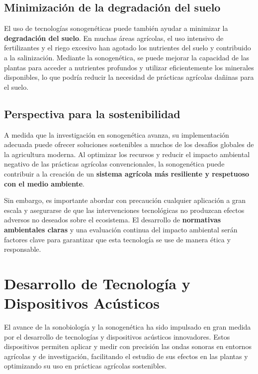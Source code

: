 \documentclass[twocolumn]{article}
\begin{document}
\subsection{Minimización de la degradación del suelo}

El uso de tecnologías sonogenéticas puede también ayudar a minimizar la \textbf{degradación del suelo}. En muchas áreas agrícolas, el uso intensivo de fertilizantes y el riego excesivo han agotado los nutrientes del suelo y contribuido a la salinización. Mediante la sonogenética, se puede mejorar la capacidad de las plantas para acceder a nutrientes profundos y utilizar eficientemente los minerales disponibles, lo que podría reducir la necesidad de prácticas agrícolas dañinas para el suelo.


\subsection{Perspectiva para la sostenibilidad}

A medida que la investigación en sonogenética avanza, su implementación adecuada puede ofrecer soluciones sostenibles a muchos de los desafíos globales de la agricultura moderna. Al optimizar los recursos y reducir el impacto ambiental negativo de las prácticas agrícolas convencionales, la sonogenética puede contribuir a la creación de un \textbf{sistema agrícola más resiliente y respetuoso con el medio ambiente}.

Sin embargo, es importante abordar con precaución cualquier aplicación a gran escala y asegurarse de que las intervenciones tecnológicas no produzcan efectos adversos no deseados sobre el ecosistema. El desarrollo de \textbf{normativas ambientales claras} y una evaluación continua del impacto ambiental serán factores clave para garantizar que esta tecnología se use de manera ética y responsable.



\section{Desarrollo de Tecnología y Dispositivos Acústicos}

El avance de la sonobiología y la sonogenética ha sido impulsado en gran medida por el desarrollo de tecnologías y dispositivos acústicos innovadores. Estos dispositivos permiten aplicar y medir con precisión las ondas sonoras en entornos agrícolas y de investigación, facilitando el estudio de sus efectos en las plantas y optimizando su uso en prácticas agrícolas sostenibles.
\end{document}
